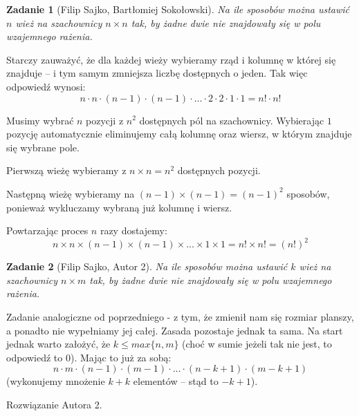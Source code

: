 \documentclass{mwart}
\newtheorem{zad}{Zadanie}[section]
\begin{document}
\begin{zad}[Filip Sajko, Bartłomiej Sokołowski]
    Na ile sposobów można ustawić $n$ wież na szachownicy
    $n \times n$ tak, by żadne dwie nie znajdowały się w
    polu wzajemnego rażenia.
\end{zad}
\begin{mdframed}
    Starczy zauważyć, że dla każdej wieży wybieramy rząd i kolumnę
    w której się znajduje -- i tym samym zmniejsza liczbę dostępnych
    o jeden. Tak więc odpowiedź wynosi: \[n \cdot n \cdot (n-1) \cdot
        (n-1) \cdot ... \cdot 2 \cdot 2 \cdot 1 \cdot 1 =  n! \cdot n!\]
\end{mdframed}
\begin{mdframed}
    Musimy wybrać $n$ pozycji z $n^2$ dostępnych pól na szachownicy. Wybierając 
    $1$ pozycję automatycznie eliminujemy całą kolumnę oraz wiersz, w którym znajduje się wybrane pole.
    \item Pierwszą wieżę wybieramy z $n \times n = n^2$ dostępnych pozycji.
    \item Następną wieżę wybieramy na $(n-1) \times (n-1) = (n-1)^2$ sposobów, ponieważ wykluczamy wybraną już kolumnę i wiersz.
    \item Powtarzając proces $n$ razy dostajemy:
    \[n \times n \times (n-1) \times (n - 1) \times ... \times 1 \times 1 = n! \times n! = (n!)^2\] 
\end{mdframed}




\begin{zad}[Filip Sajko, Autor 2]
    Na ile sposobów można ustawić $k$ wież na szachownicy $n \times m$
    tak, by żadne dwie nie znajdowały się w polu wzajemnego rażenia.
\end{zad}
\begin{mdframed}
    Zadanie analogiczne od poprzedniego - z tym, że zmienił nam się
    rozmiar planszy, a ponadto nie wypełniamy jej całej. Zasada
    pozostaje jednak ta sama. Na start jednak warto założyć, że
    $k \leq max\{n, m\}$ (choć w sumie jeżeli tak nie jest, to
    odpowiedź to 0). Mając to już za sobą:
    \[n \cdot m \cdot (n-1) \cdot (m-1) \cdot ... \cdot (n - k +1) \cdot (m -k +1)\]
    (wykonujemy mnożenie $k + k$ elementów -- stąd to $-k + 1$).
\end{mdframed}
\begin{mdframed}
    Rozwiązanie Autora 2.
\end{mdframed}
\end{document}
